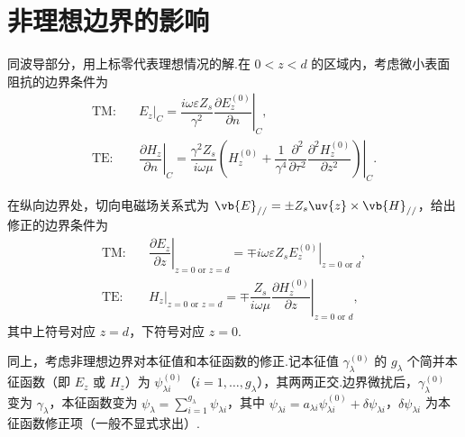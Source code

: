 \section{非理想边界的影响}

同波导部分，用上标零代表理想情况的解.在 \(0 < z < d\) 的区域内，考虑微小表面阻抗的边界条件为
\begin{align*}
	\text{TM:}\quad& \left. E_z \right|_C = \left. \dfrac{i\omega\varepsilon Z_s}{\gamma^2} \dfrac{\partial E_z^{(0)}}{\partial n} \right|_C, \\
	\text{TE:}\quad& \left. \dfrac{\partial H_z}{\partial n} \right|_C = \left. \dfrac{\gamma^2 Z_s}{i\omega\mu} \left( H_z^{(0)} + \dfrac{1}{\gamma^4} \dfrac{\partial^2}{\partial \tau^2} \dfrac{\partial^2 H_z^{(0)}}{\partial z^2} \right) \right|_C.
\end{align*}

在纵向边界处，切向电磁场关系式为 \(\vb{E}_{//} = \pm Z_s \uv{z} \times \vb{H}_{//}\)，给出修正的边界条件为
\begin{align*}
	\text{TM:}\quad& \left. \dfrac{\partial E_z}{\partial z} \right|_{z=0 \text{ or } z=d} = \left. \mp i\omega\varepsilon Z_s E_z^{(0)} \right|_{z=0 \text{ or } d}, \\
	\text{TE:}\quad& \left. H_z \right|_{z=0 \text{ or } z=d} = \left. \mp \dfrac{Z_s}{i\omega\mu} \dfrac{\partial H_z^{(0)}}{\partial z} \right|_{z=0 \text{ or } d},
\end{align*}
其中上符号对应 \(z = d\)，下符号对应 \(z = 0\).

同上，考虑非理想边界对本征值和本征函数的修正.记本征值 \(\gamma_{\lambda}^{(0)}\) 的 \(g_{\lambda}\) 个简并本征函数（即 \(E_z\) 或 \(H_z\)）为 \(\psi_{\lambda i}^{(0)}\)（\(i = 1, \dots, g_{\lambda}\)），其两两正交.边界微扰后，\(\gamma_{\lambda}^{(0)}\) 变为 \(\gamma_{\lambda}\)，本征函数变为 \(\psi_{\lambda} = \sum_{i=1}^{g_{\lambda}} \psi_{\lambda i}\)，其中 \(\psi_{\lambda i} = a_{\lambda i} \psi_{\lambda i}^{(0)} + \delta\psi_{\lambda i}\)，\(\delta\psi_{\lambda i}\) 为本征函数修正项（一般不显式求出）.

